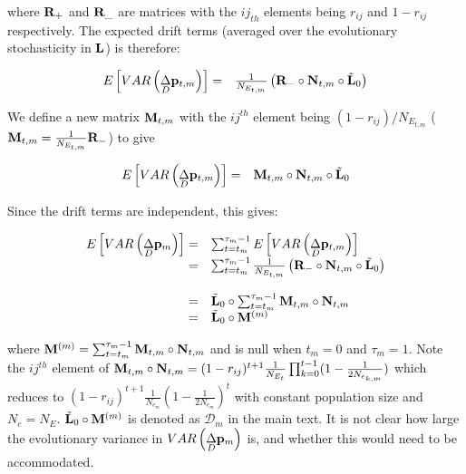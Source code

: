 \documentclass[12pt]{article}
\begin{document}
\begin{bibunit}
where ${\bf R}_{+}$ and ${\bf R}_{\_}$ are matrices with the $ij_{th}$ elements being $r_{ij}$ and $1-r_{ij}$ respectively. The expected drift terms (averaged over the evolutionary stochasticity in ${\bf L}$) is therefore:

\begin{equation}
\begin{array}{rl}
E\left[VAR\left(\underset{D}\Delta {\bf p}_{t,m}\right)\right] =& \frac{1}{N_{E_{t,m}}}\left({\bf R}_{-}\circ{\bf N}_{t,m}\circ\tilde{\bf L}_{0}\right)\\
\end{array}
\end{equation}

We define a new matrix ${\bf M}_{t,m}$ with the $ij^{th}$ element being $(1-r_{ij})/N_{E_{t,m}}$ (${\bf M}_{t,m}=\frac{1}{N_{E_{t,m}}}{\bf R}_{-}$) to give

\begin{equation}
\begin{array}{rl}
E\left[VAR\left(\underset{D}\Delta {\bf p}_{t,m}\right)\right] 
=& {\bf M}_{t,m}\circ{\bf N}_{t,m}\circ\tilde{\bf L}_{0}\\
\end{array}
\end{equation}


Since the drift terms are independent, this gives:

\begin{equation}
\begin{array}{rl}
E\left[VAR\left(\underset{D}\Delta {\bf p}_{m}\right)\right]=&\sum_{t=t_m}^{\tau_m-1}E\left[VAR\left(\underset{D}\Delta {\bf p}_{t,m}\right)\right]\\
=& \sum_{t=t_m}^{\tau_m-1}\frac{1}{N_{E_{t,m}}}\left({\bf R}_{-}\circ{\bf N}_{t,m}\circ\tilde{\bf L}_{0}\right)\\\\
=& \tilde{\bf L}_{0}\circ\sum_{t=t_m}^{\tau_m-1}{\bf M}_{t,m}\circ{\bf N}_{t,m}\\
=& \tilde{\bf L}_{0}\circ{\bf M}^{(m)}\\
\end{array}
\end{equation}

where ${\bf M}^{(m)}=\sum_{t=t_m}^{\tau_m-1}{\bf M}_{t,m}\circ{\bf N}_{t,m}$ and is null when $t_m=0$ and $\tau_m=1$.  Note the $ij^{th}$ element of ${\bf M}_{t,m}\circ{\bf N}_{t,m}=(1-r_{ij})^{t+1}\frac{1}{N_{E_t}}\prod_{k=0}^{t-1}(1-\frac{1}{2N_{e_{k,m}}})$ which reduces to $(1-r_{ij})^{t+1}\frac{1}{N_{e_m}}(1-\frac{1}{2N_{e_m}})^{t}$ with constant population size and $N_e=N_E$. $\tilde{\bf L}_{0}\circ{\bf M}^{(m)}$ is denoted as $\boldsymbol{\mathcal{D}}_m$ in the main text. It is not clear how large the evolutionary variance in $VAR\left(\underset{D}\Delta {\bf p}_{m}\right)$ is, and whether this would need to be accommodated.\\


\end{bibunit}
\end{document}
